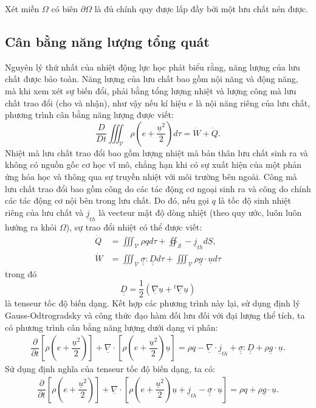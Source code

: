 Xét miền $\Omega$ có biên $\partial\Omega$ là đủ chính quy được lấp đầy bởi một lưu chất nén được.
\subsection{Cân bằng năng lượng tổng quát}
    Nguyên lý thứ nhất của nhiệt động lực học phát biểu rằng, năng lượng của lưu chất được bảo toàn. Năng lượng của lưu chất bao gồm nội năng và động năng, mà khi xem xét sự biến đổi, phải bằng tổng lượng nhiệt và lượng công mà lưu chất trao đổi (cho và nhận), như vậy nếu kí hiệu $e$ là nội năng riêng của lưu chất, phương trình cân bằng năng lượng được viết:
        \[
            \dfrac{D}{Dt}\iiint_\mathscr{V}\rho\left(e+\dfrac{\underline{u}^2}{2}\right)d\tau=\dot{W}+\dot{Q}.
        \]
    Nhiệt mà lưu chất trao đổi bao gồm lượng nhiệt mà bản thân lưu chất sinh ra và không có nguồn gốc cơ học vĩ mô, chẳng hạn khi có sự xuất hiện của một phản ứng hóa học và thông qua sự truyền nhiệt với môi trường bên ngoài. Công mà lưu chất trao đổi bao gồm công do các tác động cơ ngoại sinh ra và công do chính các tác động cơ nội bên trong lưu chất. Do đó, nếu gọi $q$ là tốc độ sinh nhiệt riêng của lưu chất và $\underline{j}_{th}$ là vecteur mật độ dòng nhiệt (theo quy ước, luôn luôn hướng ra khỏi $\Omega$), sự trao đổi nhiệt có thể được viết:
        \[
            \begin{aligned}
                \dot{Q}&=\iiint_\mathscr{V}\rho qd\tau+\oiint_\mathscr{S} -\underline{j}_{th}d\underline{S},\\
                \dot{W}&=\iiint_\mathscr{V}\underline{\underline{\sigma}}:\underline{\underline{D}}d\tau+\iiint_\mathscr{V}\rho \underline{g}\cdot\underline{u}d\tau
            \end{aligned}
        \]
    trong đó
        \[
            \underline{\underline{D}}=\dfrac{1}{2}\left(\underline{\nabla}\underline{u} +{}^t\underline{\nabla}\underline{u}\right)
        \]
    là tenseur tốc độ biến dạng. Kết hợp các phương trình này lại, sử dụng định lý Gauss-Odtrogradsky và công thức đạo hàm đối lưu đối với đại lượng thể tích, ta có phương trình cân bằng năng lượng dưới dạng vi phân:
    \begin{align}
        \dfrac{\partial}{\partial t}\left[\rho\left(e+\dfrac{\underline{u}^2}{2}\right)\right]+\underline{\nabla}\cdot\left[\rho\left(e+\dfrac{\underline{u}^2}{2}\right)\underline{u}\right]=\rho q-\underline{\nabla}\cdot\underline{j}_{th}+\underline{\underline{\sigma}}:\underline{\underline{D}}+\rho\underline{g}\cdot\underline{u}.
    \end{align}
    Sử dụng định nghĩa của tenseur tốc độ biến dạng, ta có:
        \begin{align}\label{eq:conserver_energie}
            \dfrac{\partial}{\partial t}\left[\rho\left(e+\dfrac{\underline{u}^2}{2}\right)\right]+\underline{\nabla}\cdot\left[\rho\left(e+\dfrac{\underline{u}^2}{2}\right)\underline{u}+\underline{j}_{th}-\underline{\underline{\sigma}}\cdot\underline{u}\right]=\rho q+\rho\underline{g}\cdot\underline{u}.
        \end{align}
